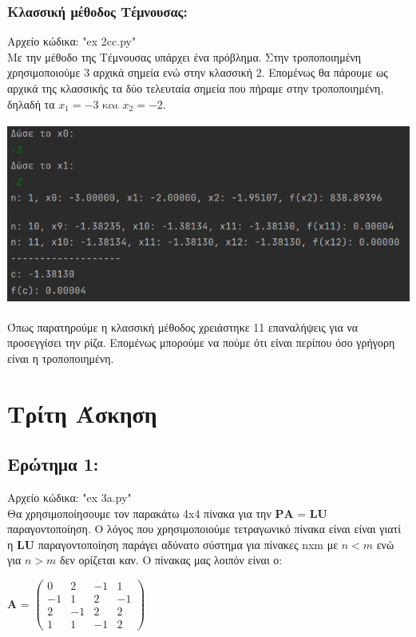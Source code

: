 \documentclass{article}
\begin{document}
    \subsubsection{Κλασσική μέθοδος Tέμνουσας:}
    Αρχείο κώδικα: "ex 2cc.py" \\
    Με την μέθοδο της Τέμνουσας υπάρχει ένα πρόβλημα. Στην τροποποιημένη χρησιμοποιούμε 3 αρχικά σημεία ενώ στην κλασσική 2. Επομένως θα πάρουμε ως αρχικά της κλασσικής τα δύο τελευταία σημεία που πήραμε στην τροποποιημένη, δηλαδή τα \(x_1 = -3 \text{ και } x_2 = -2\). \\
    \begin{center}\includegraphics[height = 6cm]{images/results_24.png}\end{center}
    Όπως παρατηρούμε η κλασσική μέθοδος χρειάστηκε 11 επαναλήψεις για να προσεγγίσει την ρίζα. Επομένως μπορούμε να πούμε ότι είναι περίπου όσο γρήγορη είναι η τροποποιημένη.

\pagebreak
\section{Τρίτη Άσκηση}

\subsection{Ερώτημα 1:}

Αρχείο κώδικα: "ex 3a.py" \\

Θα χρησιμοποίησουμε τον παρακάτω 4x4 πίνακα για την \(\textbf{PA = LU}\) παραγοντοποίηση. Ο λόγος που χρησιμοποιούμε τετραγωνικό πίνακα είναι είναι γιατί η \textbf{LU} παραγοντοποίηση παράγει αδύνατο σύστημα για πίνακες nxm με \(n < m\) ενώ για \(n > m\) δεν ορίζεται καν. Ο πίνακας μας λοιπόν είναι ο:

\begin{center}
\textbf{A} =
$\begin{pmatrix}
0 & 2 & -1 & 1\\
-1 & 1 & 2 & -1\\
2 & -1 & 2 & 2\\
1 &  1 & -1 & 2  
\end{pmatrix}$
\end{center}
\end{document}
